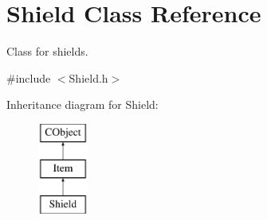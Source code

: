 \hypertarget{class_shield}{}\section{Shield Class Reference}
\label{class_shield}


Class for shields.  




{\ttfamily \#include $<$Shield.\+h$>$}

Inheritance diagram for Shield\+:\begin{figure}[H]
\begin{center}
\leavevmode
\includegraphics[height=3.000000cm]{class_shield}
\end{center}
\end{figure}
